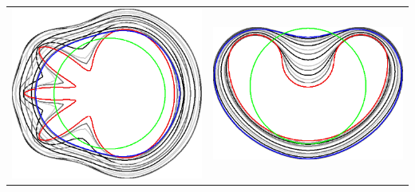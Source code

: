 \begin{frame}
{\begin{tabular}{cc}
\includegraphics[scale=0.12]{figures/graphcut/with-neighborhood-flow-always-improve/flower.png}\hspace{3em} &
\includegraphics[scale=0.12]{figures/graphcut/with-neighborhood-flow-always-improve/bean.png}
\end{tabular}}
%
%
\end{frame}
